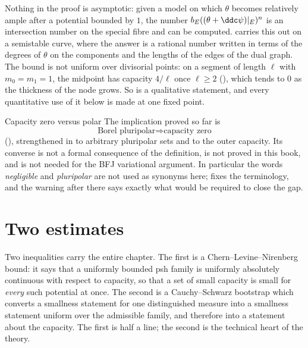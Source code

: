 \begin{remark}
\label{rem:ch25-divisorial-explicit}
Nothing in the proof is asymptotic: given a model on which $\theta$ becomes
relatively ample after a potential bounded by $1$, the number
$b_E((\theta+\ddc\psi)|_E)^n$ is an intersection number on the special
fibre and can be computed.   carries this
out on a semistable curve, where the answer is a rational number written in
terms of the degrees of $\theta$ on the components and the lengths of the
edges of the dual graph.  The bound is not uniform over divisorial points:
on a segment of length $\ell$ with $m_0=m_1=1$, the midpoint has capacity
$4/\ell$ once $\ell\geq2$
(), which tends to $0$ as the thickness
of the node grows.  So  is a
qualitative statement, and every quantitative use of it below is made at one
fixed point.
\end{remark}

\begin{warning}{Capacity zero versus polar}
The implication proved so far is
\[
       \text{Borel pluripolar}\Longrightarrow\text{capacity zero}
\]
(), strengthened in
 to arbitrary pluripolar sets and to the
outer capacity.  Its converse is not a formal consequence of the definition,
is not proved in this book, and is not needed for the BFJ variational
argument.  In particular the words \emph{negligible} and \emph{pluripolar}
are not used as synonyms here;  fixes the
terminology, and the warning after
 there says exactly what would be
required to close the gap.
\end{warning}

\section{Two estimates}
\label{sec:ch25-estimates}

Two inequalities carry the entire chapter.  The first is a
Chern--Levine--Nirenberg bound: it says that a uniformly bounded psh family
is uniformly absolutely continuous with respect to capacity, so that a set of
small capacity is small for \emph{every} such potential at once.  The second
is a Cauchy--Schwarz bootstrap which converts a smallness statement for one
distinguished measure into a smallness statement uniform over the admissible
family, and therefore into a statement about the capacity.  The first is
half a line; the second is the technical heart of the theory.

